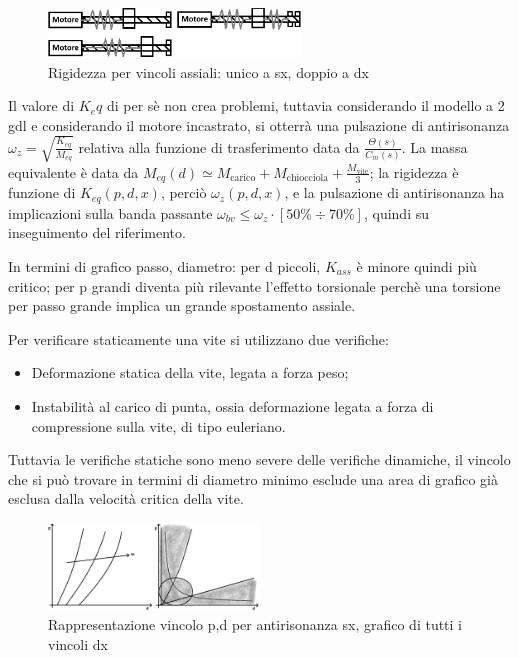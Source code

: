 \begin{figure}[h]
    \centering
    \includegraphics[width=0.6\textwidth]{Immagini/rigidezza_ass_1vs2_vincoli.png}
    \caption{Rigidezza per vincoli assiali: unico a sx, doppio a dx}
\end{figure}

Il valore di \(K_eq\) di per sè non crea problemi, tuttavia considerando il modello a 2 gdl e considerando il motore incastrato, si otterrà una pulsazione di antirisonanza \(\omega_z = \sqrt{\frac{K_{eq}}{M_{eq}}}\) relativa alla funzione di trasferimento data da \( \frac{\Theta(s)}{C_m(s)} \).
La massa equivalente è data da \( M_{eq}(d) \simeq M_\text{carico} + M_\text{chiocciola} + \frac{M_\text{vite}}{3} \); la rigidezza è funzione di \( K_{eq}(p,d,x) \), perciò \(\omega_z (p,d,x)\), e la pulsazione di antirisonanza ha implicazioni sulla banda passante \( \omega_{bv} \leqslant \omega_z \cdot [50\% \div 70\%] \), quindi su inseguimento del riferimento.

In termini di grafico passo, diametro: per d piccoli, \( K_{ass} \) è minore quindi più critico; per p grandi diventa più rilevante l'effetto torsionale perchè una torsione per passo grande implica un grande spostamento assiale.

Per verificare staticamente una vite si utilizzano due verifiche:
\begin{itemize}
    \item Deformazione statica della vite, legata a forza peso;
    \item Instabilità al carico di punta, ossia deformazione legata a forza di compressione sulla vite, di tipo euleriano.
\end{itemize}
Tuttavia le verifiche statiche sono meno severe delle verifiche dinamiche, il vincolo che si può trovare in termini di diametro minimo esclude una area di grafico già esclusa dalla velocità critica della vite.

\begin{figure}[h]
    \centering
    \includegraphics[width=0.5\textwidth]{Immagini/vincolo_antirisonanza.png}
    \caption{Rappresentazione vincolo p,d per antirisonanza sx, grafico di tutti i vincoli dx}
\end{figure}

